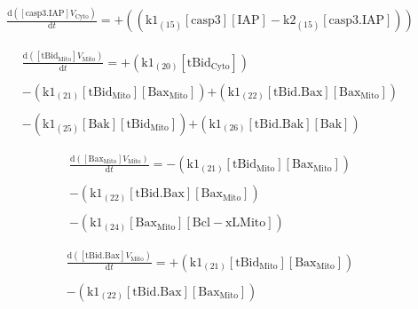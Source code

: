 \documentclass[a4paper,12pt]{article} %
\newcommand{\M}[1]{\mathrm{#1}}
\begin{document}
\begin{equation}
\begin{split}
\frac {\M{d}( {{\M{[casp3.IAP]}}    {V}_{\M{Cyto}} } ) }  {\M{d}{t} }  =  {  +  (( {{\M{k1}}_{\M{(15)}}    {\M{[casp3]}}    {\M{[IAP]}}  -  {\M{k2}}_{\M{(15)}}    {\M{[casp3.IAP]}} } )) }
\end{split}
\end{equation}


\begin{equation}
\begin{split}
\frac {\M{d}( {{\M{[tBid_{Mito}]}}    {V}_{\M{Mito}} } ) }  {\M{d}{t} }  =  {  +  ( {{\M{k1}}_{\M{(20)}}    {\M{[tBid_{Cyto}]}} } ) } \\ 
  \\ 
   {  -  ( {{\M{k1}}_{\M{(21)}}    {\M{[tBid_{Mito}]}}    {\M{[Bax_{Mito}]}} } ) } 
   {  +  ( {{\M{k1}}_{\M{(22)}}    {\M{[tBid.Bax]}}    {\M{[Bax_{Mito}]}} } ) } \\ 
  \\ 
   {  -  ( {{\M{k1}}_{\M{(25)}}    {\M{[Bak]}}    {\M{[tBid_{Mito}]}} } ) }
   {  +  ( {{\M{k1}}_{\M{(26)}}    {\M{[tBid.Bak]}}    {\M{[Bak]}} } ) } 
\end{split}
\end{equation}

\begin{equation}
\begin{split}
\frac {\M{d}( {{\M{[Bax_{Mito}]}}    {V}_{\M{Mito}} } ) }  {\M{d}{t} }  =  {  -  ( {{\M{k1}}_{\M{(21)}}    {\M{[tBid_{Mito}]}}    {\M{[Bax_{Mito}]}} } ) } \\ 
  \\ 
   {  -  ( {{\M{k1}}_{\M{(22)}}    {\M{[tBid.Bax]}}    {\M{[Bax_{Mito}]}} } ) } \\ 
  \\ 
   {  -  ( {{\M{k1}}_{\M{(24)}}    {\M{[Bax_{Mito}]}}    {\M{[Bcl-xL{Mito}]}} } ) }
\end{split}
\end{equation}

\begin{equation}
\begin{split}
\frac {\M{d}( {{\M{[tBid.Bax]}}    {V}_{\M{Mito}} } ) }  {\M{d}{t} }  =  {  +  ( {{\M{k1}}_{\M{(21)}}    {\M{[tBid_{Mito}]}}    {\M{[Bax_{Mito}]}} } ) } \\ 
  \\ 
   {  -  ( {{\M{k1}}_{\M{(22)}}    {\M{[tBid.Bax]}}    {\M{[Bax_{Mito}]}} } ) }
\end{split}
\end{equation}
\end{document}

